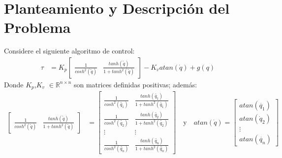 \documentclass[12pt]{article}
\begin{document}
\section{Planteamiento y Descripción del Problema}
Considere el siguiente algoritmo de control:
\begin{equation}
    \begin{split}
        \tau&=K_p
        \begin{bmatrix}
            \frac{1}{cosh^2(\tilde{q})}&\frac{tanh(\tilde{q})}{1+tanh^2(\tilde{q})}
        \end{bmatrix}
        -K_vatan(\dot{q})+g(q)
    \end{split}
    \label{eq:tau}
\end{equation}
Donde $K_p$,$K_v$ $\in \mathbb{R}^{n\times n}$ son matrices definidas positivas; además:
\begin{equation}
    \begin{split}
        \begin{bmatrix}
            \frac{1}{cosh^2(\tilde{q})}&\frac{tanh(\tilde{q})}{1+tanh^2(\tilde{q})}
        \end{bmatrix}&=
        \begin{bmatrix}
            \frac{1}{cosh^2(\tilde{q_1})}&\frac{tanh(\tilde{q_1})}{1+tanh^2(\tilde{q_1})}\\
            \frac{1}{cosh^2(\tilde{q_2})}&\frac{tanh(\tilde{q_2})}{1+tanh^2(\tilde{q_2})}\\
            \vdots&\vdots\\
            \frac{1}{cosh^2(\tilde{q_n})}&\frac{tanh(\tilde{q_n})}{1+tanh^2(\tilde{q_n})}
        \end{bmatrix}
        \quad\text{y}\quad
        atan(\dot{q})=
        \begin{bmatrix}
            atan(\dot{q_1})\\
            atan(\dot{q}_2)\\
            \vdots\\
            atan(\dot{q_n})
        \end{bmatrix}\\
    \end{split}
    \label{eq:matrix_form}
\end{equation}
\end{document}
